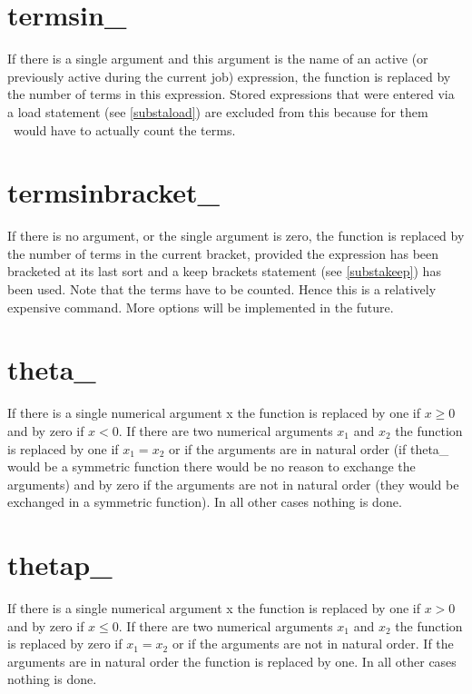 \section{termsin\_}
\label{funtermsin}
\noindent If there is a single argument and this argument is the name of an 
active (or previously active during the current job) expression, the 
function is replaced by the number of terms in this 
expression. Stored expressions that were entered via a load statement (see 
\ref{substaload}) are excluded from this because for them \FORM\ would have 
to actually count the terms.

 
\section{termsinbracket\_}
\label{funtermsinbracket}
\noindent If there is no argument, or the single argument is zero, the 
function is replaced by the number of terms in the current 
bracket, provided the expression has been bracketed at its 
last sort and a keep brackets statement (see \ref{substakeep}) has been 
used. Note that the terms have to be counted. Hence this is a relatively 
expensive command. More options will be implemented in the future.


\section{theta\_}
\label{funtheta}
\noindent If there is a single numerical argument x the function is 
replaced by one if $x \ge 0$ and by zero if $x < 0$. If there are two 
numerical arguments $x_1$ and $x_2$ the function is replaced by one if $x_1 
= x_2$ or if the arguments are in natural order (if theta\_ would be a 
symmetric function there would be no reason to exchange the arguments) and 
by zero if the arguments are not in natural order (they would be exchanged 
in a symmetric function). In all other cases nothing is done.


\section{thetap\_}
\label{funthetap}
\noindent If there is a single numerical argument x the function is 
replaced by one if $x > 0$ and by zero if $x \le 0$. If there are two 
numerical arguments $x_1$ and $x_2$ the function is replaced by zero if $x_1 
= x_2$ or if the arguments are not in natural order. If the arguments are 
in natural order the function is replaced by one. In all other cases 
nothing is done.

